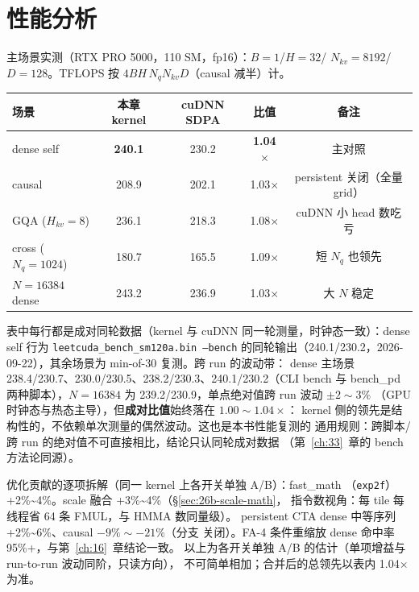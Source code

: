 \section{性能分析}\label{sec:26b-perf}

主场景实测（RTX PRO 5000，110 SM，fp16）：$B{=}1$/$H{=}32$/
$N_{kv}{=}8192$/$D{=}128$。TFLOPS 按 $4BH\,N_qN_{kv}D$（causal 减半）计。

\begin{center}
\begin{tabular}{lcccc}
\toprule
场景 & 本章 kernel & cuDNN SDPA & 比值 & 备注 \\
\midrule
dense self & \textbf{240.1} & 230.2 & \textbf{1.04$\times$} & 主对照 \\
causal & 208.9 & 202.1 & 1.03$\times$ & persistent 关闭（全量 grid） \\
GQA ($H_{kv}{=}8$) & 236.1 & 218.3 & 1.08$\times$ & cuDNN 小 head 数吃亏 \\
cross ($N_q{=}1024$) & 180.7 & 165.5 & 1.09$\times$ & 短 $N_q$ 也领先 \\
$N{=}16384$ dense & 243.2 & 236.9 & 1.03$\times$ & 大 $N$ 稳定 \\
\bottomrule
\end{tabular}
\end{center}

表中每行都是成对同轮数据（kernel 与 cuDNN 同一轮测量，时钟态一致）：dense self
行为 \texttt{leetcuda\_\allowbreak{}bench\_\allowbreak{}sm120a.\allowbreak{}bin --bench}
的同轮输出（240.1/230.2，2026-09-22），其余场景为 min-of-30 复测。跨 run 的波动带：
dense 主场景 238.4/230.7、230.0/230.5、238.2/230.3、240.1/230.2（CLI bench 与 bench\_pd
两种脚本），$N{=}16384$ 为 239.2/230.9，单点绝对值跨 run 波动 $\pm2\sim3\%$
（GPU 时钟态与热态主导），但\textbf{成对比值}始终落在 $1.00\sim1.04\times$：
kernel 侧的领先是结构性的，不依赖单次测量的偶然波动。这也是本书性能复测的
通用规则：跨脚本/跨 run 的绝对值不可直接相比，结论只认同轮成对数据
（第~\ref{ch:33}~章的 bench 方法论同源）。

优化贡献的逐项拆解（同一 kernel 上各开关单独 A/B）：fast\_math
（\texttt{exp2f}）+2\%\textasciitilde4\%。scale 融合 +3\%\textasciitilde4\%（\S\ref{sec:26b-scale-math}，
指令数视角：每 tile 每线程省 64 条 FMUL，与 HMMA 数同量级）。
persistent CTA dense 中等序列 +2\%\textasciitilde6\%、causal $-9\%\sim-21\%$（分支
关闭）。FA-4 条件重缩放 dense 命中率 95\%+，与第~\ref{ch:16}~章结论一致。
以上为各开关单独 A/B 的估计（单项增益与 run-to-run 波动同阶，只读方向），
不可简单相加；合并后的总领先以表内 1.04$\times$ 为准。

